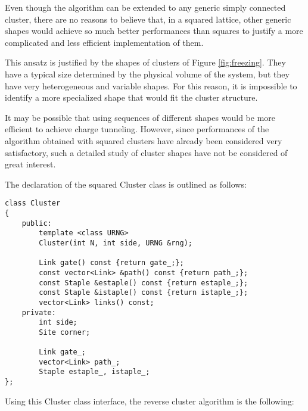 Even though the algorithm can be extended to any generic simply connected cluster,
there are no reasons to believe that, in a squared lattice,
other generic shapes would achieve so much better performances than squares
to justify a more complicated and less efficient implementation of them.

This ansatz is justified by the shapes of clusters of Figure \ref{fig:freezing}.
They have a typical size determined by the physical volume of the system,
but they have very heterogeneous and variable shapes. 
For this reason,
it is impossible to identify a more specialized shape that would fit the cluster structure.

It may be possible that using sequences of different shapes would be more efficient to achieve charge tunneling.
However, since performances of the algorithm obtained with squared clusters have already been considered very satisfactory,
such a detailed study of cluster shapes have not be considered of great interest.

The declaration of the squared {\ttfamily Cluster} class is outlined as follows:

\begin{lstlisting}[caption={Cluster class declaration}]
class Cluster
{
    public:
        template <class URNG>
        Cluster(int N, int side, URNG &rng);

        Link gate() const {return gate_;};
        const vector<Link> &path() const {return path_;};
        const Staple &estaple() const {return estaple_;};
        const Staple &istaple() const {return istaple_;};
        vector<Link> links() const;
    private:
        int side;
        Site corner;

        Link gate_;
        vector<Link> path_;
        Staple estaple_, istaple_;
};
\end{lstlisting}

Using this {\ttfamily Cluster} class interface, the reverse cluster algorithm is the following:

